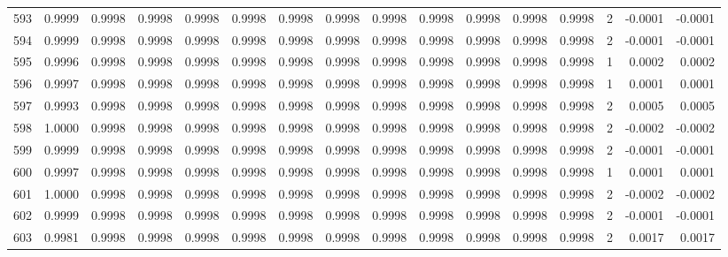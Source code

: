 \begin{tabular}{lrrrrrrrrrrrrrrr}
593 &      0.9999 &  0.9998 &  0.9998 &  0.9998 &  0.9998 &  0.9998 &  0.9998 &  0.9998 &  0.9998 &  0.9998 &   0.9998 &     0.9998 &      2 &                   -0.0001 &                    -0.0001 \\
594 &      0.9999 &  0.9998 &  0.9998 &  0.9998 &  0.9998 &  0.9998 &  0.9998 &  0.9998 &  0.9998 &  0.9998 &   0.9998 &     0.9998 &      2 &                   -0.0001 &                    -0.0001 \\
595 &      0.9996 &  0.9998 &  0.9998 &  0.9998 &  0.9998 &  0.9998 &  0.9998 &  0.9998 &  0.9998 &  0.9998 &   0.9998 &     0.9998 &      1 &                    0.0002 &                     0.0002 \\
596 &      0.9997 &  0.9998 &  0.9998 &  0.9998 &  0.9998 &  0.9998 &  0.9998 &  0.9998 &  0.9998 &  0.9998 &   0.9998 &     0.9998 &      1 &                    0.0001 &                     0.0001 \\
597 &      0.9993 &  0.9998 &  0.9998 &  0.9998 &  0.9998 &  0.9998 &  0.9998 &  0.9998 &  0.9998 &  0.9998 &   0.9998 &     0.9998 &      2 &                    0.0005 &                     0.0005 \\
598 &      1.0000 &  0.9998 &  0.9998 &  0.9998 &  0.9998 &  0.9998 &  0.9998 &  0.9998 &  0.9998 &  0.9998 &   0.9998 &     0.9998 &      2 &                   -0.0002 &                    -0.0002 \\
599 &      0.9999 &  0.9998 &  0.9998 &  0.9998 &  0.9998 &  0.9998 &  0.9998 &  0.9998 &  0.9998 &  0.9998 &   0.9998 &     0.9998 &      2 &                   -0.0001 &                    -0.0001 \\
600 &      0.9997 &  0.9998 &  0.9998 &  0.9998 &  0.9998 &  0.9998 &  0.9998 &  0.9998 &  0.9998 &  0.9998 &   0.9998 &     0.9998 &      1 &                    0.0001 &                     0.0001 \\
601 &      1.0000 &  0.9998 &  0.9998 &  0.9998 &  0.9998 &  0.9998 &  0.9998 &  0.9998 &  0.9998 &  0.9998 &   0.9998 &     0.9998 &      2 &                   -0.0002 &                    -0.0002 \\
602 &      0.9999 &  0.9998 &  0.9998 &  0.9998 &  0.9998 &  0.9998 &  0.9998 &  0.9998 &  0.9998 &  0.9998 &   0.9998 &     0.9998 &      2 &                   -0.0001 &                    -0.0001 \\
603 &      0.9981 &  0.9998 &  0.9998 &  0.9998 &  0.9998 &  0.9998 &  0.9998 &  0.9998 &  0.9998 &  0.9998 &   0.9998 &     0.9998 &      2 &                    0.0017 &                     0.0017 \\

\end{tabular}
